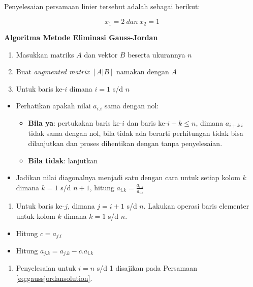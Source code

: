 \documentclass[]{book}
\providecommand{\tightlist}{%
  \setlength{\itemsep}{0pt}\setlength{\parskip}{0pt}}
\theoremstyle{definition}
\theoremstyle{definition}
\theoremstyle{definition}
\theoremstyle{remark}
\begin{document}
Penyelesaian persamaan linier tersebut adalah sebagai berikut:

\[
x_1=2\ dan\ x_2=1
\]

\textbf{Algoritma Metode Eliminasi Gauss-Jordan}

\begin{enumerate}
\def\labelenumi{\arabic{enumi}.}
\tightlist
\item
  Masukkan matriks \(A\) dan vektor \(B\) beserta ukurannya \(n\)
\item
  Buat \emph{augmented matrix} \(\left[A|B\right]\) namakan dengan \(A\)
\item
  Untuk baris ke-\(i\) dimana \(i=1\) s/d \(n\)
\end{enumerate}

\begin{itemize}
\item
  Perhatikan apakah nilai \(a_{i.i}\) sama dengan nol:

  \begin{itemize}
  \tightlist
  \item
    \textbf{Bila ya}: pertukakan baris ke-\(i\) dan baris ke-\(i+k\le n\), dimana \(a_{i+k.i}\) tidak sama dengan nol, bila tidak ada berarti perhitungan tidak bisa dilanjutkan dan proses dihentikan dengan tanpa penyelesaian.
  \item
    \textbf{Bila tidak}: lanjutkan
  \end{itemize}
\item
  Jadikan nilai diagonalnya menjadi satu dengan cara untuk setiap kolom \(k\) dimana \(k=1\) s/d \(n+1\), hitung \(a_{i.k}=\frac{a_{i.k}}{a_{i.i}}\)
\end{itemize}

\begin{enumerate}
\def\labelenumi{\arabic{enumi}.}
\setcounter{enumi}{3}
\tightlist
\item
  Untuk baris ke-\(j\), dimana \(j=i+1\) s/d \(n\). Lakukan operasi baris elementer untuk kolom \(k\) dimana \(k=1\) s/d \(n\).
\end{enumerate}

\begin{itemize}
\tightlist
\item
  Hitung \(c=a_{j.i}\)
\item
  Hitung \(a_{j.k}=a_{j.k}-c.a_{i.k}\)
\end{itemize}

\begin{enumerate}
\def\labelenumi{\arabic{enumi}.}
\setcounter{enumi}{4}
\tightlist
\item
  Penyelesaian untuk \(i=n\) s/d 1 disajikan pada Persamaan \eqref{eq:gaussjordansolution}.
\end{enumerate}
\end{document}

